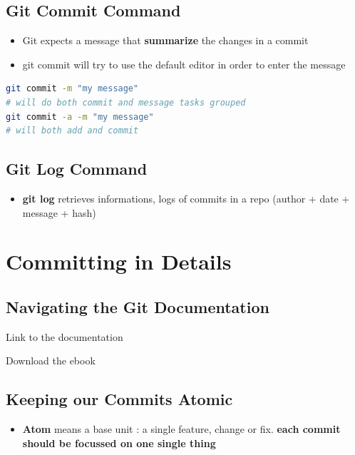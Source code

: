 \documentclass{report}
\begin{document}
\section{Git Commit Command}

\begin{itemize}
	\item Git expects a message that \textbf{summarize} the changes in a commit 
	\item git commit will try to use the default editor in order to enter the message
\end{itemize}
\begin{tcolorbox}[title=Commit,colback=backcolour]
\begin{lstlisting}[language=bash]
git commit -m "my message"
# will do both commit and message tasks grouped
git commit -a -m "my message"
# will both add and commit
\end{lstlisting}
\end{tcolorbox}


\section{Git Log Command}

\begin{itemize}
	\item \textbf{git log} retrieves informations, logs of commits in a repo (author + date + message + hash)
\end{itemize}



\chapter{Committing in Details}


\section{Navigating the Git Documentation}
Link to the documentation 

Download the ebook


\section{Keeping our Commits Atomic}

\begin{itemize}
	\item \textbf{Atom} means a base unit : a single feature, change or fix. \textbf{each commit should be focussed on one single thing} 
\end{itemize}
\end{document}
